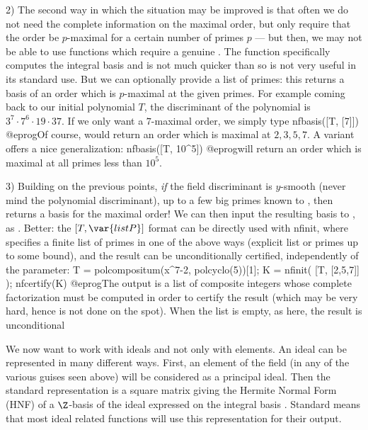 2) The second way in which the situation may be improved is that often we do
not need the complete information on the maximal order, but only require that
the order be $p$-maximal for a certain number of primes $p$ --- but then, we
may not be able to use functions which require a genuine . The
function  specifically computes the integral basis and is not
much quicker than  so is not very useful in its standard use. But
we can optionally provide a list of primes: this returns a basis of an order
which is $p$-maximal at the given primes. For example coming back to our
initial polynomial $T$, the discriminant of the polynomial is
$3^7\cdot7^6\cdot19\cdot37$. If we only want a $7$-maximal order, we simply
type
\bprog
  nfbasis([T, [7]])
@eprog\noindent Of course,  would return an
order which is maximal at $2,3,5,7$. A variant offers a nice generalization:
\bprog
  nfbasis([T, 10^5])
@eprog\noindent will return an order which is maximal at all primes less than
$10^5$.

3) Building on the previous points, \emph{if} the field discriminant is
$y$-smooth (never mind the polynomial discriminant), up to a few big primes
known to , then  returns a basis for
the maximal order! We can then input the resulting basis to , as
. Better: the $[T, \var{listP}]$ format can be
directly used with nfinit, where  specifies a finite list of
primes in one of the above ways (explicit list or primes up to some bound),
and the result can be unconditionally certified, independently of the
 parameter:
\bprog
  T = polcompositum(x^7-2, polcyclo(5))[1];
  K = nfinit( [T, [2,5,7]] );
  nfcertify(K)
@eprog\noindent The output is a list of composite integers whose complete
factorization must be computed in order to certify the result (which may be
very hard, hence is not done on the spot). When the list is empty, as here,
the result is unconditional



We now want to work with ideals and not only
with elements. An ideal can be represented in many different ways. First, an
element of the field (in any of the various guises seen above) will be
considered as a principal ideal. Then the standard representation is a
square matrix giving the Hermite Normal Form (HNF) of a $\Z$-basis of the
ideal expressed on the integral basis . Standard means that most
ideal related functions will use this representation for their output.

